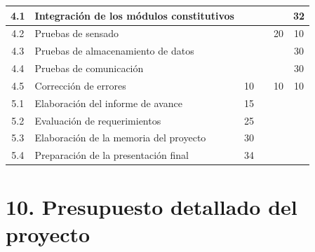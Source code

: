 \documentclass[11pt]{charter}
\begin{document}
\begin{table}[H]
\begin{tabularx}{\linewidth}{@{}|c|X|c|c|c|c|@{}}
4.1 & Integración de los módulos constitutivos &  &  &  & 32 \\ \hline
4.2 & Pruebas de sensado &  &  & 20 & 10 \\ \hline
4.3 & Pruebas de almacenamiento de datos&  &  &  & 30 \\ \hline
4.4 & Pruebas de comunicación &  &  &  & 30 \\ \hline
4.5 & Corrección de errores & 10 &  & 10 & 10 \\ \hline
5.1 & Elaboración del informe de avance& 15 &  &  &  \\ \hline
5.2 & Evaluación de requerimientos & 25 &  &  &  \\ \hline
5.3 & Elaboración de la memoria del proyecto & 30 &  &  &  \\ \hline
5.4 & Preparación de la presentación final & 34 &  &  &  \\ \hline
\end{tabularx}
\end{table}

\newpage
\section{10. Presupuesto detallado del proyecto}
\label{sec:presupuesto}
\end{document}
